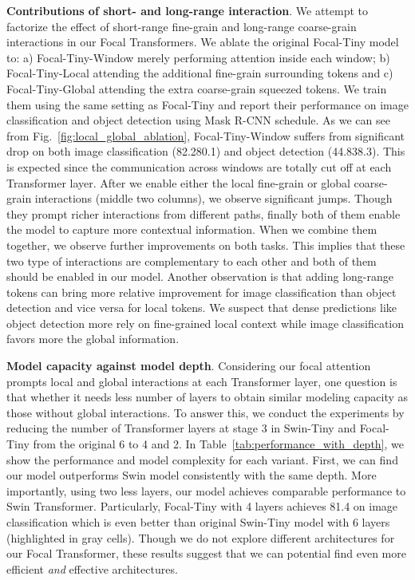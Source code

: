 \documentclass{article}
\begin{document}
\textbf{Contributions of short- and long-range interaction}. We attempt to factorize the effect of short-range fine-grain and long-range coarse-grain interactions in our Focal Transformers. We ablate the original Focal-Tiny model to: a) Focal-Tiny-Window merely performing attention inside each window; b) Focal-Tiny-Local attending the additional fine-grain surrounding tokens and c) Focal-Tiny-Global attending the extra coarse-grain squeezed tokens. We train them using the same setting as Focal-Tiny and report their performance on image classification and object detection using Mask R-CNN  schedule. As we can see from Fig.~\ref{fig:local_global_ablation}, Focal-Tiny-Window suffers from significant drop on both image classification (82.280.1) and object detection (44.838.3). This is expected since the communication across windows are totally cut off at each Transformer layer. After we enable either the local fine-grain or global coarse-grain interactions (middle two columns), we observe significant jumps. Though they prompt richer interactions from different paths, finally both of them enable the model to capture more contextual information. When we combine them together, we observe further improvements on both tasks. This implies that these two type of interactions are complementary to each other and both of them should be enabled in our model. Another observation is that adding long-range tokens can bring more relative improvement for image classification than object detection and vice versa for local tokens. We suspect that dense predictions like object detection more rely on fine-grained local context while image classification favors more the global information.


\textbf{Model capacity against model depth}. Considering our focal attention prompts local and global interactions at each Transformer layer, one question is that whether it needs less number of layers to obtain similar modeling capacity as those without global interactions. To answer this, we conduct the experiments by reducing the number of Transformer layers at stage 3 in Swin-Tiny and Focal-Tiny from the original 6 to 4 and 2. In Table~\ref{tab:performance_with_depth}, we show the performance and model complexity for each variant. First, we can find our model outperforms Swin model consistently with the same depth. More importantly, using two less layers, our model achieves comparable performance to Swin Transformer. Particularly, Focal-Tiny with 4 layers achieves 81.4 on image classification which is even better than original Swin-Tiny model with 6 layers (highlighted in gray cells). Though we do not explore different architectures for our Focal Transformer, these results suggest that we can potential find even more efficient \emph{and} effective architectures.
\end{document}
